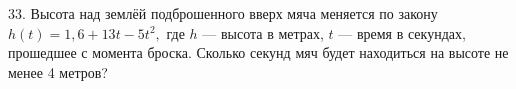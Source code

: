 33. Высота над землёй подброшенного вверх мяча меняется по закону $h(t)=1,6+13t-5t^2,$ где $h$ --- высота в метрах, $t$ --- время в секундах, прошедшее с момента броска. Сколько секунд мяч будет находиться на высоте не менее 4 метров?\\
